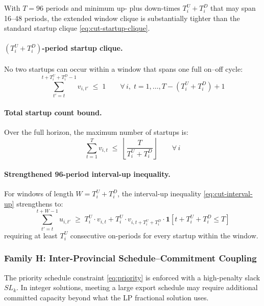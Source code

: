 With $T = 96$ periods and minimum up- plus down-times $T^U_i + T^D_i$ that
may span 16--48 periods, the extended window clique is substantially tighter
than the standard startup clique \eqref{eq:cut-startup-clique}.

\paragraph{$(T^U_i + T^D_i)$-period startup clique.}
No two startups can occur within a window that spans one full on--off cycle:
\begin{equation}\label{eq:cut-G-clique}
  \boxed{
    \sum_{t'=t}^{t+T^U_i+T^D_i-1} v_{i,t'} \;\leq\; 1
    \qquad \forall\, i,\; t = 1,\ldots,T-(T^U_i+T^D_i)+1
  }
\end{equation}

\paragraph{Total startup count bound.}
Over the full horizon, the maximum number of startups is:
\begin{equation}\label{eq:cut-G-maxstart}
  \sum_{t=1}^{T} v_{i,t}
  \;\leq\;
  \left\lfloor \frac{T}{T^U_i + T^D_i} \right\rfloor
  \qquad \forall\, i
\end{equation}

\paragraph{Strengthened 96-period interval-up inequality.}
For windows of length $W = T^U_i + T^D_i$, the interval-up inequality
\eqref{eq:cut-interval-up} strengthens to:
\begin{equation}\label{eq:cut-G-interval}
  \sum_{t'=t}^{t+W-1} u_{i,t'}
  \;\geq\;
  T^U_i \cdot v_{i,t}
  + T^U_i \cdot v_{i,t+T^U_i+T^D_i} \cdot \mathbf{1}[t+T^U_i+T^D_i \leq T]
\end{equation}
requiring at least $T^U_i$ consecutive on-periods for every startup within
the window.

\subsubsection{Family H: Inter-Provincial Schedule--Commitment Coupling}
\label{sec:cut-H}

The priority schedule constraint \eqref{eq:priority} is enforced with a
high-penalty slack $SL_k$.  In integer solutions, meeting a large export
schedule may require additional committed capacity beyond what the LP
fractional solution uses.

